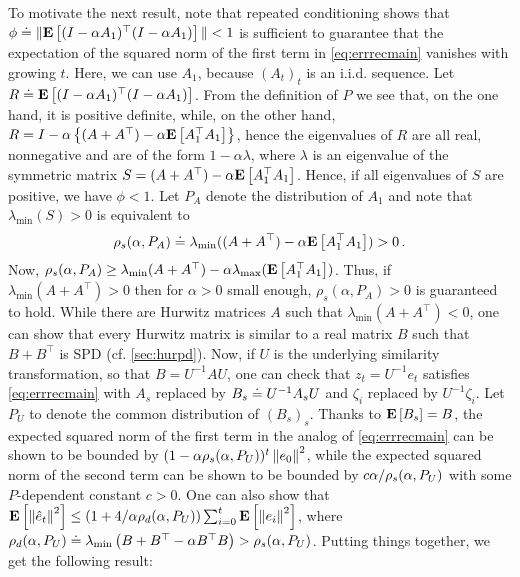 \iffalse
From \eqref{eq:errrecmain}, it is clear that the magnitude of $\hat e_t$ is governed by the behavior
of the products $\Pi_{s=i+1}^{t}(I-\alpha A_s)$, $j=0,\dots,t$. 
Here, we will perform some crude upper bounding and derive simple sufficient conditions that guarantee that on expectation these product matrices are ``small''. However, we will show that the error bounds derived are tight in a worst-case sense.
\fi

To motivate the next result, note that repeated conditioning shows that
$\phi \doteq \|  \mathbf{E}\left[ (I-\alpha A_1)^\top (I-\alpha A_1)\right] \|<1$ is sufficient 
 to guarantee that the expectation of the squared norm of the
 first term in \eqref{eq:errrecmain} vanishes with growing $t$.
Here, we can use $A_1$, because $(A_t)_t$ is an i.i.d. sequence.
Let $R \doteq \mathbf{E}\left[ (I-\alpha A_1)^\top (I-\alpha A_1)\right]$.
From the definition of $P$ we see that, on the one hand, it is positive
definite, while, on the other hand,
$R= I - \alpha \left\{(A+A^\top) -\alpha \mathbf{E}\left[A_1^\top A_1\right]\right\}$,
hence the eigenvalues of $R$ are all real, nonnegative
and are of the form $1-\alpha \lambda$,
where $\lambda$ is an eigenvalue of the symmetric matrix 
$S = (A+A^\top) -\alpha \mathbf{E}\left[A_1^\top A_1\right]$.
Hence, if all eigenvalues of $S$ are positive, we have
$\phi<1$. 
Let $P_A$ denote the distribution of $A_1$ and note that $\lambda_{\min}(S)>0$ is equivalent to
\begin{align*}
\rho_s(\alpha,P_A) \doteq \lambda_{\min} ((A+A^\top) -\alpha \mathbf{E}\left[A_1^\top A_1\right] )>0\,.
\end{align*}
Now,
$\rho_s(\alpha,P_A) \ge \lambda_{\min}( A+A^\top ) - \alpha \lambda_{\max} (\mathbf{E}\left[ A_1^\top A_1\right])$. Thus, if $\lambda_{\min}(A+A^\top)>0$ then for $\alpha>0$ small enough, $\rho_s(\alpha,P_A)>0$ is guaranteed to hold. While there are Hurwitz matrices $A$ such that $\lambda_{\min}(A+A^\top)<0$, one can show that every Hurwitz matrix is similar to a real matrix $B$ such that $B+B^\top$ is SPD (cf. \cref{sec:hurpd}). Now, if $U$ is the underlying similarity transformation, so that $B=U^{-1} A U$, one can check that $z_t = U^{-1} e_t$ satisfies \eqref{eq:errrecmain} with $A_s$ replaced by $B_s \doteq U^{-1} A_s U$ and $\zeta_i$ replaced by $U^{-1} \zeta_i$. Let $P_U$ to denote the common distribution of $(B_s)_s$.
Thanks to $\mathbf{E}\left[B_s\right] = B$, the expected squared norm of the first term in the analog of  \eqref{eq:errrecmain} can be shown to be bounded by $(1-\alpha \rho_s(\alpha,P_U))^t\left\| e_0\right\|^2$, 
while the expected squared norm of the second term can be shown to be bounded by $c \alpha /\rho_s(\alpha,P_U)$ with some $P$-dependent constant $c>0$. One can also show that $\mathbf{E}\left[\left\| \hat e_t\right\|^2\right]\le (1+4/\alpha \rho_d(\alpha,P_U)) \sum_{i=0}^t \mathbf{E}\left[ \left\| e_i\right\|^2 \right]$, where $\rho_d(\alpha,P_U) \doteq \lambda_{\min}\left(B+B^\top - \alpha B^\top B\right)>\rho_s(\alpha,P_U)$. Putting things together, we get the following result:
